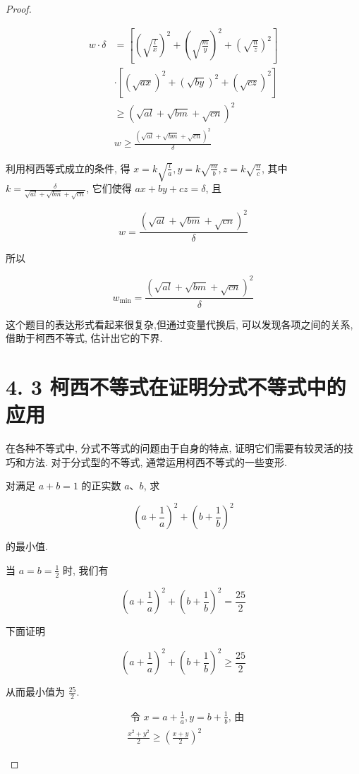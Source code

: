\begin{proof}
\begin{example}
\begin{solution}
\begin{solution}
	$$
	\begin{aligned}
	w \cdot \delta & =\left[\left(\sqrt{\frac{l}{x}}\right)^{2}+\left(\sqrt{\frac{m}{y}}\right)^{2}+\left(\sqrt{\frac{n}{z}}\right)^{2}\right] \\
	& \cdot\left[(\sqrt{a x})^{2}+(\sqrt{b y})^{2}+(\sqrt{c z})^{2}\right] \\
	& \geqslant(\sqrt{a l}+\sqrt{b m}+\sqrt{c n})^{2} \\
	& w \geqslant \frac{(\sqrt{a l}+\sqrt{b m}+\sqrt{c n})^{2}}{\delta}
	\end{aligned}
	$$
	
	利用柯西等式成立的条件, 得 $x=k \sqrt{\frac{l}{a}}, y=k \sqrt{\frac{m}{b}}, z=k \sqrt{\frac{n}{c}}$, 其中 $k=\frac{\delta}{\sqrt{a l}+\sqrt{b m}+\sqrt{c n}}$, 它们使得 $a x+b y+c z=\delta$, 且
	
	$$
	w=\frac{(\sqrt{a l}+\sqrt{b m}+\sqrt{c n})^{2}}{\delta}
	$$
	
	所以
	
	$$
	w_{\min }=\frac{(\sqrt{a l}+\sqrt{b m}+\sqrt{c n})^{2}}{\delta}
	$$
\end{solution}
\begin{note}
	这个题目的表达形式看起来很复杂,但通过变量代换后, 可以发现各项之间的关系,借助于柯西不等式, 估计出它的下界.
	
	\section*{4. 3 柯西不等式在证明分式不等式中的应用}
	在各种不等式中, 分式不等式的问题由于自身的特点, 证明它们需要有较灵活的技巧和方法. 对于分式型的不等式, 通常运用柯西不等式的一些变形.

\begin{example}
	对满足 $a+b=1$ 的正实数 $a 、 b$, 求
	
	$$
	\left(a+\frac{1}{a}\right)^{2}+\left(b+\frac{1}{b}\right)^{2}
	$$
	
	的最小值.
\end{example}
\begin{solution}
	当 $a=b=\frac{1}{2}$ 时, 我们有
	
	$$
	\left(a+\frac{1}{a}\right)^{2}+\left(b+\frac{1}{b}\right)^{2}=\frac{25}{2}
	$$
	
	下面证明
	
	$$
	\left(a+\frac{1}{a}\right)^{2}+\left(b+\frac{1}{b}\right)^{2} \geqslant \frac{25}{2}
	$$
	
	从而最小值为 $\frac{25}{2}$.
	
	$$
	\begin{aligned}
	& \text { 令 } x=a+\frac{1}{a}, y=b+\frac{1}{b} \text {, 由 } \\
	& \frac{x^{2}+y^{2}}{2} \geqslant\left(\frac{x+y}{2}\right)^{2}
	\end{aligned}
	$$
	

\end{solution}
\end{note}
\end{solution}
\end{example}
\end{proof}
